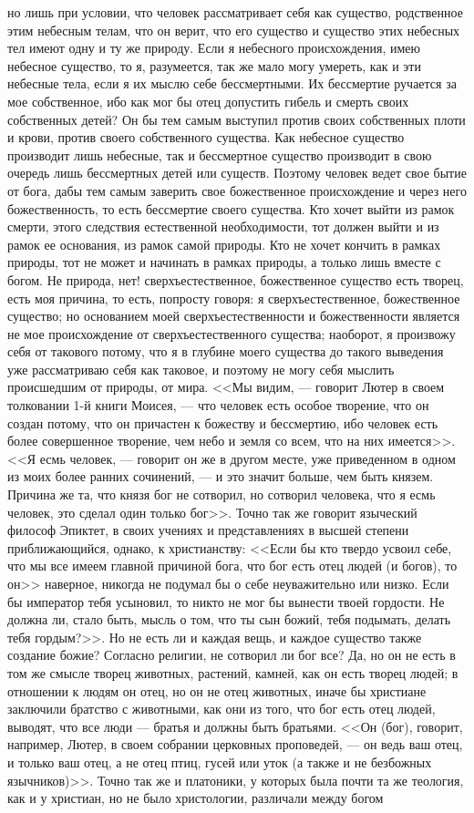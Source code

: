 \documentclass[12pt]{article}
\begin{document}
но лишь при условии, что человек рассматривает себя как существо, родственное этим небесным телам, что он верит, что его существо и существо этих небесных тел имеют одну и ту же природу. Если я небесного происхождения, имею небесное существо, то я, разумеется, так же мало могу умереть, как и эти небесные тела, если я их мыслю себе бессмертными. Их бессмертие ручается за мое собственное, ибо как мог бы отец допустить гибель и смерть своих собственных детей? Он бы тем самым выступил против своих собственных плоти и крови, против своего собственного существа. Как небесное существо производит лишь небесные, так и бессмертное существо производит в свою очередь лишь бессмертных детей или существ. Поэтому человек ведет свое бытие от бога, дабы тем самым заверить свое божественное происхождение и через него божественность, то есть бессмертие своего существа. Кто хочет выйти из рамок смерти, этого следствия естественной необходимости, тот должен выйти и из рамок ее основания, из рамок самой природы. Кто не хочет кончить в рамках природы, тот не может и начинать в рамках природы, а только лишь вместе с богом. Не природа, нет! сверхъестественное, божественное существо есть творец, есть моя причина, то есть, попросту говоря: я сверхъестественное, божественное существо; но основанием моей сверхъестественности и божественности является не мое происхождение от сверхъестественного существа; наоборот, я произвожу себя от такового потому, что я в глубине моего существа до такого выведения уже рассматриваю себя как таковое, и поэтому не могу себя мыслить происшедшим от природы, от мира. <<Мы видим, --- говорит Лютер в своем толковании 1-й книги Моисея, --- что человек есть особое творение, что он создан потому, что он причастен к божеству и бессмертию, ибо человек есть более совершенное творение, чем небо и земля со всем, что на них имеется>>. <<Я есмь человек, --- говорит он же в другом месте, уже приведенном в одном из моих более ранних сочинений, --- и это значит больше, чем быть князем. Причина же та, что князя бог не сотворил, но сотворил человека, что я есмь человек, это сделал один только бог>>. Точно так же говорит языческий философ Эпиктет, в своих учениях и представлениях в высшей степени приближающийся, однако, к христианству: <<Если бы кто твердо усвоил себе, что мы все имеем главной причиной бога, что бог есть отец людей (и богов), то он>> наверное, никогда не подумал бы о себе неуважительно или низко. Если бы император тебя усыновил, то никто не мог бы вынести твоей гордости. Не должна ли, стало быть, мысль о том, что ты сын божий, тебя подымать, делать тебя гордым?>>. Но не есть ли и каждая вещь, и каждое существо также создание божие? Согласно религии, не сотворил ли бог все? Да, но он не есть в том же смысле творец животных, растений, камней, как он есть творец людей; в отношении к людям он отец, но он не отец животных, иначе бы христиане заключили братство с животными, как они из того, что бог есть отец людей, выводят, что все люди --- братья и должны быть братьями. <<Он (бог), говорит, например, Лютер, в своем собрании церковных проповедей, --- он ведь ваш отец, и только ваш отец, а не отец птиц, гусей или уток (а также и не безбожных язычников)>>. Точно так же и платоники, у которых была почти та же теология, как и у христиан, но не было христологии, различали между богом 
\end{document}
